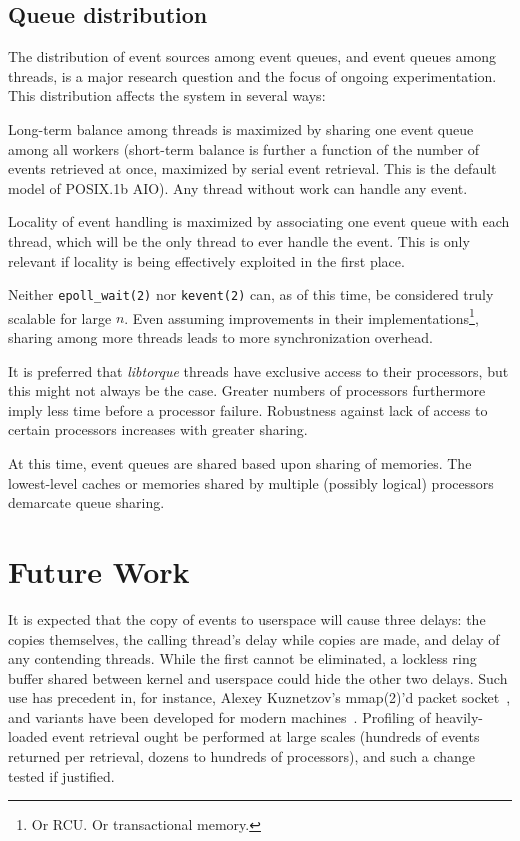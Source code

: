 \documentclass[letterpaper,10pt]{article}
\begin{document}
\begin{multicols}{2}
\subsection{Queue distribution}
\label{sec:queuedist}
The distribution of event sources among event queues, and event queues among
threads, is a major research question and the focus of ongoing
experimentation. This distribution affects the system in several ways:
\begin{description}
\setlength{\itemsep}{0pt}
\setlength{\parsep}{0pt}
\setlength{\parskip}{0pt}
\item[Balance:] Long-term balance among threads is maximized by sharing one
event queue among all workers (short-term balance is further a function of
the number of events retrieved at once, maximized by serial event retrieval.
This is the default model of POSIX.1b AIO). Any thread without work can handle
any event.
\item[Locality:] Locality of event handling is maximized by associating one
event queue with each thread, which will be the only thread to ever handle
the event. This is only relevant if locality is being effectively exploited in
the first place.
\item[Overhead:] Neither \texttt{epoll\_wait(2)} nor \texttt{kevent(2)} can, as
of this time, be considered truly scalable for large $n$. Even assuming
improvements in their implementations\footnote{Or RCU. Or transactional memory.}, sharing
among more threads leads to more synchronization overhead.
\item[Robustness:] It is preferred that \textit{libtorque} threads have exclusive
access to their processors, but this might not always be the case. Greater numbers
of processors furthermore imply less time before a processor failure. Robustness
against lack of access to certain processors increases with greater sharing.
\end{description}
At this time, event queues are shared based upon sharing of memories. The
lowest-level caches or memories shared by multiple (possibly logical)
processors demarcate queue sharing.
\section{Future Work}
It is expected that the copy of events to userspace will cause three delays:
the copies themselves, the calling thread's delay while copies are made, and
delay of any contending threads. While the first cannot be eliminated, a
lockless ring buffer shared between kernel and userspace could hide the other
two delays. Such use has precedent in, for instance, Alexey Kuznetzov's
mmap(2)'d packet socket~\cite{packetMmap}, and variants have been developed
for modern machines~\cite{Lee09}. Profiling of heavily-loaded event retrieval
ought be performed at large scales (hundreds of events returned per retrieval,
dozens to hundreds of processors), and such a change tested if justified.


\end{multicols}
\end{document}
